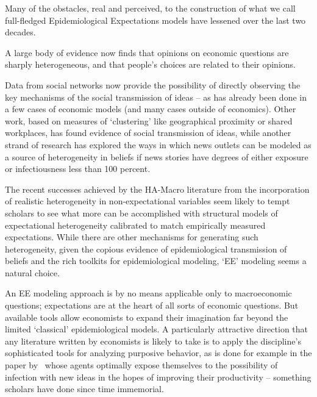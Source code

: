 
\label{conclusion}%

Many of the obstacles, real and perceived, to the construction of what we call full-fledged Epidemiological Expectations models have lessened over the last two decades.

A large body of evidence now finds that opinions on economic questions are sharply heterogeneous, and that people's choices are related to their opinions.

Data from social networks now provide the possibility of directly observing the key mechanisms of the social transmission of ideas -- as  has already been done in a few cases of economic models (and many cases outside of economics).  Other work, based on measures of `clustering' like geographical proximity or shared workplaces, has found evidence of social transmission of ideas, while another strand of research has explored the ways in which news outlets can be modeled as a source of heterogeneity in beliefs if news stories have degrees of either exposure or infectiousness less than 100 percent.

The recent successes achieved by the HA-Macro literature from the incorporation of realistic heterogeneity in non-expectational variables seem likely to tempt scholars to see what more can be accomplished with structural models of expectational heterogeneity calibrated to match empirically measured expectations.  While there are other mechanisms for generating such heterogeneity, given the copious evidence of epidemiological transmission of beliefs and the rich toolkits for epidemiological modeling, `EE' modeling seems a natural choice.

An EE modeling approach is by no means applicable only to macroeconomic questions; expectations are at the heart of all sorts of economic questions.  But available tools allow economists to expand their imagination far beyond the limited `classical' epidemiological models.  A particularly attractive direction that any literature written by economists is likely to take is to apply the discipline's sophisticated tools for analyzing purposive behavior, as is done for example in the paper by~\cite{lucas2014knowledge} whose agents optimally expose themselves to the possibility of infection with new ideas in the hopes of improving their productivity -- something scholars have done since time immemorial.



